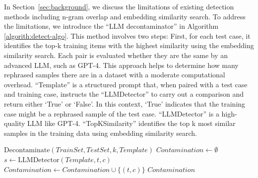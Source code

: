 In Section~\ref{sec:background}, we discuss the limitations of existing detection methods including n-gram overlap and embedding similarity search.
To address the limitations, we introduce the ``LLM decontaminator'' in Algorithm \ref{algorith:detect-algo}. This method involves two steps: First, for each test case, it identifies the top-k training items with the highest similarity using the embedding similarity search. 
Each pair is evaluated whether they are the same by an advanced LLM, such as GPT-4.
This approach helps to determine how many rephrased samples there are in a dataset with a moderate computational overhead.
``Template'' is a structured prompt that, when paired with a test case and training case, instructs the ``LLMDetector'' to carry out a comparison and return either `True' or `False'. 
In this context, `True' indicates that the training case might be a rephrased sample of the test case. ``LLMDetector'' is a high-quality LLM like GPT-4.
``TopKSimilarity'' identifies the top k most similar samples in the training data using embedding similarity search.

\begin{algorithm}
\caption{The algorithm for LLM decontaminator}
\label{algorith:detect-algo}

\begin{algorithmic}[1]
\ENSURE \( \text{Decontaminate}(TrainSet, TestSet, k, Template) \) 
\STATE \( Contamination \leftarrow \emptyset \)
        \STATE \(s \leftarrow \text{LLMDetector}(Template, t, c)\)
            \STATE \( Contamination \leftarrow Contamination\cup\{(t, c)\} \)
        \ENDIF
    \ENDFOR
\ENDFOR
\RETURN \( Contamination \)
\end{algorithmic}
\end{algorithm}
\belowcaptionskip=10pt

